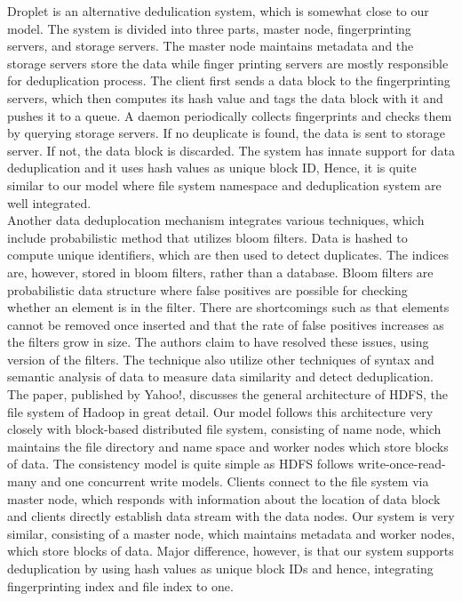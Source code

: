 \documentclass[11pt]{article}
\begin{document}
Droplet is an alternative dedulication system, which is somewhat close to our model\cite{Droplet}. The system is divided into three parts, master node, fingerprinting servers, and storage servers. The master node maintains metadata and the storage servers store the data while finger printing servers are mostly responsible for deduplication process. The client first sends a data block to the fingerprinting servers, which then computes its hash value and tags the data block with it and pushes it to a queue. A daemon periodically collects fingerprints and checks them by querying storage servers. If no deuplicate is found, the data is sent to storage server. If not, the data block is discarded. The system has innate support for data deduplication and it uses hash values as unique block ID, Hence, it is quite similar to our model where file system namespace and deduplication system are well integrated. \\


Another data deduplocation mechanism integrates various techniques, which include probabilistic method that utilizes bloom filters\cite{Bloom}. Data is hashed to compute unique identifiers, which are then used to detect duplicates. The indices are, however, stored in bloom filters, rather than a database. Bloom filters are probabilistic data structure where false positives are possible for checking whether an element is in the filter. There are shortcomings such as that elements cannot be removed once inserted and that the rate of false positives increases as the filters grow in size. The authors claim to have resolved these issues, using version of the filters. The technique also utilize other techniques of syntax and semantic analysis of data to measure data similarity and detect deduplication.\\

The paper, published by Yahoo!, discusses the general architecture of HDFS, the file system of Hadoop in great detail\cite{HDFS}. Our model follows this architecture very closely with block-based distributed file system, consisting of name node, which maintains the file directory and name space and worker nodes which store blocks of data. The consistency model is quite simple as HDFS follows write-once-read-many and one concurrent write models. Clients connect to the file system via master node, which responds with information about the location of data block and clients directly establish data stream with the data nodes. Our system is very similar, consisting of a master node, which maintains metadata and worker nodes, which store blocks of data. Major difference, however, is that our system supports deduplication by using hash values as unique block IDs and hence, integrating fingerprinting index and file index to one.
\end{document}
